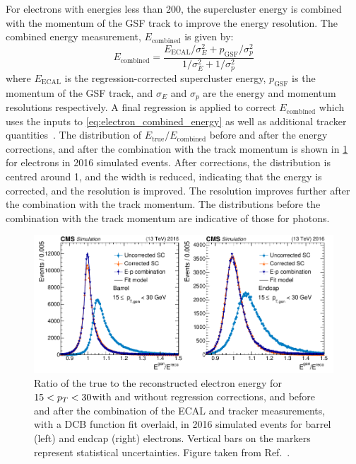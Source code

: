For electrons with energies less than 200\GeV, the supercluster energy is combined with the momentum of the GSF track to improve the energy resolution. The combined energy measurement, $E_{\text{combined}}$ is given by:
\begin{equation}
  E_{\text{combined}} = \frac{E_{\text{ECAL}} / \sigma_E^2 + p_{\text{GSF}} / \sigma_p^2}{1 / \sigma_E^2 + 1 / \sigma_p^2}
  \label{eq:electron_combined_energy}
\end{equation}
where $E_{\text{ECAL}}$ is the regression-corrected supercluster energy, $p_{\text{GSF}}$ is the momentum of the GSF track, and $\sigma_E$ and $\sigma_p$ are the energy and momentum resolutions respectively. A final regression is applied to correct $E_{\text{combined}}$ which uses the inputs to \cref{eq:electron_combined_energy} as well as additional tracker quantities~\cite{CMS:2020uim}. The distribution of $E_{\text{true}}/E_{\text{combined}}$ before and after the energy corrections, and after the combination with the track momentum is shown in \cref{fig:ecal_regression_performance} for electrons in 2016 simulated events. After corrections, the distribution is centred around 1, and the width is reduced, indicating that the energy is corrected, and the resolution is improved. The resolution improves further after the combination with the track momentum. The distributions before the combination with the track momentum are indicative of those for photons. 

\begin{figure}
  \centering
  \includegraphics[width=\textwidth]{Figures/Detector/CMS/ecal_regression_performance.pdf}
  \caption[Electron Energy Corrections]{Ratio of the true to the reconstructed electron energy for $15 < p_T < 30$\GeV with and without regression corrections, and before and after the combination of the ECAL and tracker measurements, with a DCB function fit overlaid, in 2016 simulated events for barrel (left) and endcap (right) electrons. Vertical bars on the markers represent statistical uncertainties. Figure taken from Ref.~\cite{CMS:2020uim}.}\label{fig:ecal_regression_performance}
\end{figure}

